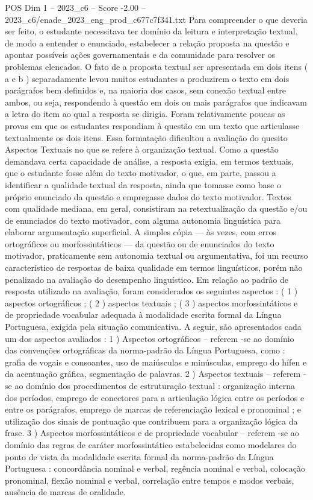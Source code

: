 \begin{textsample}{POS Dim 1 – 2023\_c6 – Score -2.00 – 2023\_c6/enade\_2023\_eng\_prod\_c677c7f341.txt}
Para compreender o que deveria ser feito, o estudante necessitava ter domínio da leitura e interpretação textual, de modo a entender o enunciado, estabelecer a relação proposta na questão e apontar possíveis ações governamentais e da comunidade para resolver os problemas elencados.
O fato de a proposta textual ser apresentada em dois itens ( a e b ) separadamente levou muitos estudantes a produzirem o texto em dois parágrafos bem definidos e, na maioria dos casos, sem conexão textual entre ambos, ou seja, respondendo à questão em dois ou mais parágrafos que indicavam a letra do item ao qual a resposta se dirigia.
Foram relativamente poucas as provas em que os estudantes respondiam à questão em um texto que articulasse textualmente os dois itens.
Essa formatação dificultou a avaliação do quesito Aspectos Textuais no que se refere à organização textual.
Como a questão demandava certa capacidade de análise, a resposta exigia, em termos textuais, que o estudante fosse além do texto motivador, o que, em parte, passou a identificar a qualidade textual da resposta, ainda que tomasse como base o próprio enunciado da questão e empregasse dados do texto motivador.
Textos com qualidade mediana, em geral, consistiram na retextualização da questão e/ou de enunciados do texto motivador, com alguma autonomia linguística para elaborar argumentação superficial.
A simples cópia — às vezes, com erros ortográficos ou morfossintáticos — da questão ou de enunciados do texto motivador, praticamente sem autonomia textual ou argumentativa, foi um recurso característico de respostas de baixa qualidade em termos linguísticos, porém não penalizado na avaliação do desempenho linguístico.
Em relação ao padrão de resposta utilizado na avaliação, foram considerados os seguintes aspectos : ( 1 ) aspectos ortográficos ; ( 2 ) aspectos textuais ; ( 3 ) aspectos morfossintáticos e de propriedade vocabular adequada à modalidade escrita formal da Língua Portuguesa, exigida pela situação comunicativa.
A seguir, são apresentados cada um dos aspectos avaliados : 1 ) Aspectos ortográficos – referem -se ao domínio das convenções ortográficas da norma-padrão da Língua Portuguesa, como : grafia de vogais e consoantes, uso de maiúsculas e minúsculas, emprego do hífen e da acentuação gráfica, segmentação de palavras. 2 ) Aspectos textuais – referem -se ao domínio dos procedimentos de estruturação textual : organização interna dos períodos, emprego de conectores para a articulação lógica entre os períodos e entre os parágrafos, emprego de marcas de referenciação lexical e pronominal ; e utilização dos sinais de pontuação que contribuem para a organização lógica da frase. 3 ) Aspectos morfossintáticos e de propriedade vocabular – referem -se ao domínio das regras de caráter morfossintático estabelecidas como modelares do ponto de vista da modalidade escrita formal da norma-padrão da Língua Portuguesa : concordância nominal e verbal, regência nominal e verbal, colocação pronominal, flexão nominal e verbal, correlação entre tempos e modos verbais, ausência de marcas de oralidade.

\end{textsample}
